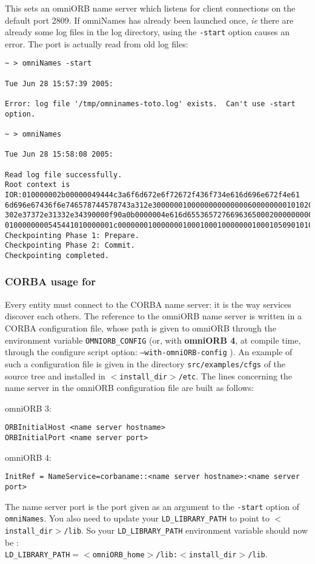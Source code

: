 This sets an omniORB name server which listens for client connections on the
default port 2809. If omniNames has already been launched once, \emph{ie} there
are already some log files in the log directory, using the \texttt{-start}
option causes an error. The port is actually read from old log files:

{\footnotesize
\begin{verbatim}
~ > omniNames -start

Tue Jun 28 15:57:39 2005:

Error: log file '/tmp/omninames-toto.log' exists.  Can't use -start option.

~ > omniNames  

Tue Jun 28 15:58:08 2005:

Read log file successfully.
Root context is IOR:010000002b00000049444c3a6f6d672e6f72672f436f734e616d696e672f4e61
6d696e67436f6e746578744578743a312e300000010000000000000060000000010102000d0000003134
302e37372e31332e34390000f90a0b0000004e616d655365727669636500020000000000000008000000
0100000000545441010000001c0000000100000001000100010000000100010509010100010000000901
Checkpointing Phase 1: Prepare.
Checkpointing Phase 2: Commit.
Checkpointing completed.
\end{verbatim}
}

\subsubsection{CORBA usage for \diet}

Every \diet entity must connect to the CORBA name server: it is the way
services discover each others. The reference to the omniORB name server is
written in a CORBA configuration file, whose path is given to omniORB through
the environment variable \texttt{OMNIORB\_CONFIG} (or, with \textbf{omniORB 4},
at compile time, through the configure script option:
\texttt{--with-omniORB-config} ). An example of such a configuration file is
given in the directory \texttt{src/examples/cfgs} of the \diet source tree and
installed in \texttt{$<$install\_dir$>$/etc}. The lines concerning the name
server in the omniORB configuration file are built as follows:
\begin{description}
 \item{omniORB 3:}
{\footnotesize
\begin{verbatim}
ORBInitialHost <name server hostname>
ORBInitialPort <name server port>
\end{verbatim}
}
 \item{omniORB 4:}
{\footnotesize
\begin{verbatim}
InitRef = NameService=corbaname::<name server hostname>:<name server port>
\end{verbatim}
} 
\end{description}
The name server port is the port given as an argument to the \texttt{-start}
option of \texttt{omniNames}. You also need to update your
\texttt{LD\_LIBRARY\_PATH} to point to \texttt{$<$install\_dir$>$/lib}.  So
your \texttt{LD\_LIBRARY\_PATH} environment variable should now be
:\\ \texttt{LD\_LIBRARY\_PATH$= <$omniORB\_home$>$/lib:$<$install\_dir$>$/lib}.

